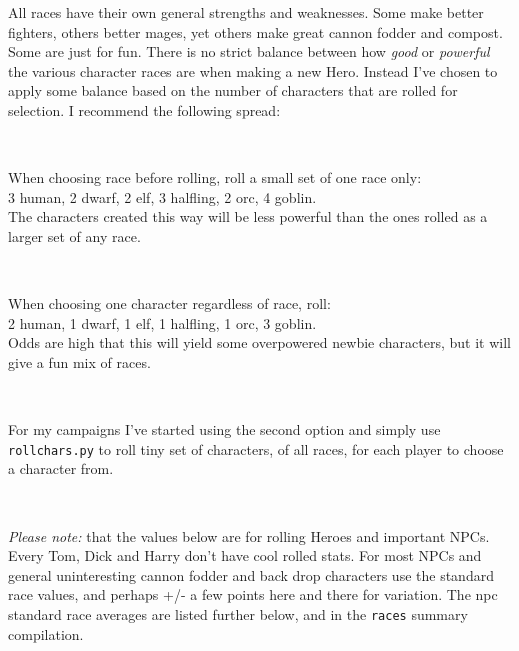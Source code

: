 
\noindent All races have their own general strengths and weaknesses. Some make better fighters, others better mages, yet others make great cannon fodder and compost. Some are just for fun.
There is no strict balance between how \emph{good} or \emph{powerful} the various character races are when making a new Hero. Instead I've chosen to apply some balance based on the number of characters that are rolled for selection. I recommend the following spread:

\

\noindent When choosing race before rolling, roll a small set of one race only:\\
3 human, 2 dwarf, 2 elf, 3 halfling, 2 orc, 4 goblin.\\
The characters created this way will be less powerful than the ones rolled as a larger set of any race.

\

\noindent When choosing one character regardless of race, roll:\\
2 human, 1 dwarf, 1 elf, 1 halfling, 1 orc, 3 goblin.\\
Odds are high that this will yield some overpowered newbie characters, but it will give a fun mix of races.

\

\noindent For my campaigns I've started using the second option and simply use \verb|rollchars.py| to roll tiny set of characters, of all races, for each player to choose a character from.

\

\noindent \emph{Please note:} that the values below are for rolling Heroes and important NPCs. Every Tom, Dick and Harry don't have cool rolled stats. For most NPCs and general uninteresting cannon fodder and back drop characters use the standard race values, and perhaps +/- a few points here and there for variation. The npc standard race averages are listed further below, and in the \verb|races| summary compilation.








